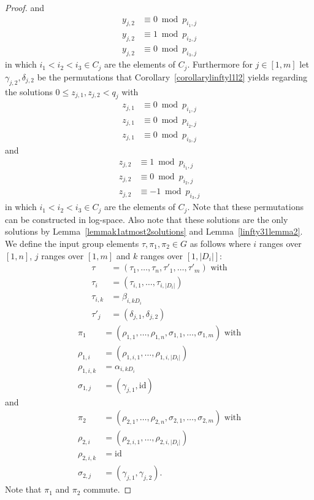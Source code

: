 \documentclass{article}
\begin{document}
\begin{proof}
and
\begin{align*}
y_{j,2}&\equiv 0 \bmod p_{i_1,j}\\
y_{j,2}&\equiv 1 \bmod p_{i_2,j}\\
y_{j,2}&\equiv 0 \bmod p_{i_3,j}
\end{align*}
in which $i_1 < i_2 < i_3 \in C_j$ are the elements of $C_j$. Furthermore for $j \in [1,m]$ let $\gamma_{j,2},\delta_{j,2}$ be the permutations that Corollary~\ref{corollarylinftyl1l2} yields regarding the solutions $0 \leq z_{j,1},z_{j,2} < q_j$ with
\begin{align*}
z_{j,1}&\equiv 0 \bmod p_{i_1,j}\\
z_{j,1}&\equiv 0 \bmod p_{i_2,j}\\
z_{j,1}&\equiv 0 \bmod p_{i_3,j}
\end{align*}
and
\begin{align*}
z_{j,2}&\equiv 1 \bmod p_{i_1,j}\\
z_{j,2}&\equiv 0 \bmod p_{i_2,j}\\
z_{j,2}&\equiv -1 \bmod p_{i_3,j}
\end{align*}
in which $i_1 < i_2 < i_3 \in C_j$ are the elements of $C_j$. Note that these permutations can be constructed in log-space. Also note that these solutions are the only solutions by Lemma~\ref{lemmak1atmost2solutions} and Lemma~\ref{linfty31lemma2}. We define the input group elements $\tau, \pi_1, \pi_2 \in G$ as follows where $i$ ranges over $[1,n]$, $j$ ranges over $[1,m]$ and $k$ ranges over $[1,|D_i|]$:
\begin{align*}
\tau &= (\tau_1,\dots,\tau_n, \tau'_1,\dots,\tau'_m) \text{ with}\\
\tau_i &= (\tau_{i,1},\dots,\tau_{i,|D_i|})\\
\tau_{i,k} &= \beta_{i,kD_i}\\
\tau'_j &= (\delta_{j,1},\delta_{j,2})
\end{align*}
\begin{align*}
\pi_1 &= (\rho_{1,1},\dots,\rho_{1,n},\sigma_{1,1},\dots,\sigma_{1,m}) \text{ with}\\
\rho_{1,i} &= (\rho_{1,i,1},\dots,\rho_{1,i,|D_i|})\\
\rho_{1,i,k} &= \alpha_{i,kD_i}\\
\sigma_{1,j} &= (\gamma_{j,1},\mathrm{id})
\end{align*}
and
\begin{align*}
\pi_2 &= (\rho_{2,1},\dots,\rho_{2,n},\sigma_{2,1},\dots,\sigma_{2,m}) \text{ with}\\
\rho_{2,i} &= (\rho_{2,i,1},\dots,\rho_{2,i,|D_i|})\\
\rho_{2,i,k} &= \mathrm{id}\\
\sigma_{2,j} &= (\gamma_{j,1},\gamma_{j,2}).
\end{align*}
Note that $\pi_1$ and $\pi_2$ commute.


\end{proof}
\end{document}
